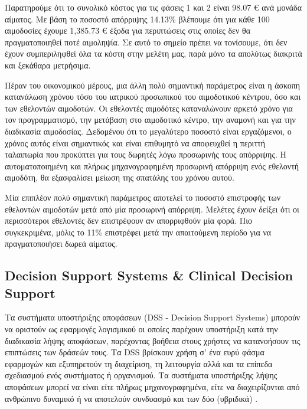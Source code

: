 		Παρατηρούμε ότι το συνολικό κόστος για τις φάσεις 1 και 2 είναι 98.07 € ανά μονάδα αίματος.  Με βάση το ποσοστό απόρριψης 14.13\% βλέπουμε ότι για κάθε 100 αιμοδοσίες έχουμε 1,385.73 € έξοδα για περιπτώσεις στις οποίες δεν θα πραγματοποιηθεί ποτέ αιμοληψία. Σε αυτό το σημείο πρέπει να τονίσουμε, ότι δεν έχουν συμπεριληφθεί όλα τα κόστη στην μελέτη μας, παρά μόνο τα απολύτως διακριτά και ξεκάθαρα μετρήσιμα.
	
		Πέραν του οικονομικού μέρους, μια άλλη πολύ σημαντική παράμετρος είναι η άσκοπη κατανάλωση χρόνου τόσο του ιατρικού προσωπικού του αιμοδοτικού κέντρου, όσο και των εθελοντών αιμοδοτών. Οι εθελοντές αιμοδότες καταναλώνουν αρκετό χρόνο για τον προγραμματισμό, την μετάβαση στο αιμοδοτικό κέντρο, την αναμονή και για την διαδικασία αιμοδοσίας.  Δεδομένου ότι το μεγαλύτερο ποσοστό είναι εργαζόμενοι, ο χρόνος αυτός είναι σημαντικός και είναι επιθυμητό να αποφευχθεί η περιττή ταλαιπωρία που προκύπτει για τους δωρητές λόγω προσωρινής τους απόρριψης. Η αυτοματοποιημένη και πλήρως μηχανογραφημένη προσωρινή απόρριψη ενός εθελοντή αιμοδότη, θα εξασφαλίσει μείωση της σπατάλης του χρόνου αυτού.
		
		Μία επιπλέον πολύ σημαντική παράμετρος αποτελεί το ποσοστό επιστροφής των εθελοντών αιμοδοτών μετά από μία προσωρινή απόρριψη. Μελέτες έχουν δείξει ότι οι περισσότεροι εθελοντές δεν επιστρέφουν αν απορριφθούν μία φορά. Πιο συγκεκριμένα, μόλις το 11\% επιστρέφει μετά την απαιτούμενη περίοδο για να πραγματοποιήσει δωρεά αίματος\cite{halperin1998effect}.
	
		
	\subsection{Decision Support Systems \& Clinical Decision Support}
		Τα συστήματα υποστήριξης αποφάσεων (DSS - Decision Support Systems) μπορούν να οριστούν ως εφαρμογές λογισμικού οι οποίες παρέχουν υποστήριξη κατά την διαδικασία λήψης αποφάσεων, παρέχοντας βοήθεια στους χρήστες να κατανοήσουν τις επιπτώσεις των δράσεών τους\cite{french2000decision}. Τα DSS βρίσκουν χρήση σ' ένα ευρύ φάσμα εφαρμογών και εξυπηρετούν τη διαχείριση, τη λειτουργία αλλά και τα επίπεδα σχεδιασμού ενός συστήματος ή οργανισμού. Τα συστήματα υποστήριξης λήψης αποφάσεων μπορεί να είναι είτε πλήρως μηχανογραφημένα, είτε να διαχειρίζονται από ανθρώπινο δυναμικό  ή να αποτελούν συνδυασμό και των δύο (υβριδικά) \cite{miller}. 
		
